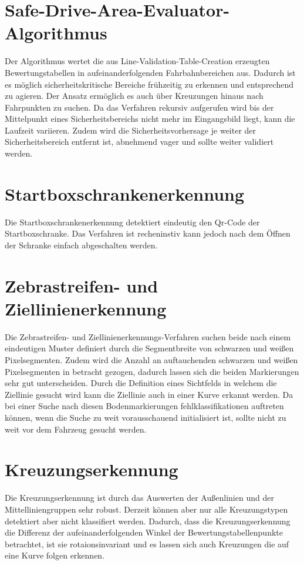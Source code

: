 \section{Safe-Drive-Area-Evaluator-Algorithmus}
\label{section:Safe-Drive-Area-Evaluator-Algorithmus}

Der Algorithmus wertet die aus Line-Validation-Table-Creation erzeugten Bewertungstabellen in aufeinanderfolgenden Fahrbahnbereichen aus. Dadurch ist es m{\"o}glich sicherheitskritische Bereiche fr{\"u}hzeitig zu erkennen und entsprechend zu agieren. Der Ansatz erm{\"o}glich es auch {\"u}ber Kreuzungen hinaus nach Fahrpunkten zu suchen. Da das Verfahren rekursiv aufgerufen wird bis der Mittelpunkt eines Sicherheitsbereichs nicht mehr im Eingangsbild liegt, kann die Laufzeit variieren. Zudem wird die Sicherheitsvorhersage je weiter der Sicherheitsbereich entfernt ist, abnehmend vager und sollte weiter validiert werden.

\section{Startboxschrankenerkennung}
\label{section:Startboxschrankenerkennung}
Die Startboxschrankenerkennung detektiert eindeutig den Qr-Code der Startboxschranke. Das Verfahren ist recheninstiv kann jedoch nach dem {\"O}ffnen der Schranke einfach abgeschalten werden.


\section{Zebrastreifen- und Ziellinienerkennung}
\label{section:Zebrastreifen- und Ziellinienerkennung}
Die Zebrastreifen- und Ziellinienerkennungs-Verfahren suchen beide nach einem eindeutigen Muster definiert durch die Segmentbreite von schwarzen und wei{\ss}en Pixelsegmenten. Zudem wird die Anzahl an auftauchenden schwarzen und wei{\ss}en Pixelsegmenten in betracht gezogen, dadurch lassen sich die beiden Markierungen sehr gut unterscheiden.
Durch die Definition eines Sichtfelds in welchem die Ziellinie gesucht wird kann die Ziellinie auch in einer Kurve erkannt werden.
Da bei einer Suche nach diesen Bodenmarkierungen fehlklassifikationen auftreten k{\"o}nnen, wenn die Suche zu weit vorausschauend initialisiert ist, sollte nicht zu weit vor dem Fahrzeug gesucht werden.  


\section{Kreuzungserkennung}
\label{section:Kreuzungserkennung}
Die Kreuzungserkennung ist durch das Auswerten der Au{\ss}enlinien und der Mittelliniengruppen sehr robust. Derzeit k{\"o}nnen aber nur alle Kreuzungstypen detektiert aber nicht klassifiert werden. Dadurch, dass die Kreuzungserkennung die Differenz der aufeinanderfolgenden Winkel der Bewertungstabellenpunkte betrachtet, ist sie rotaionsinvariant und es lassen sich auch Kreuzungen die auf eine Kurve folgen erkennen.

